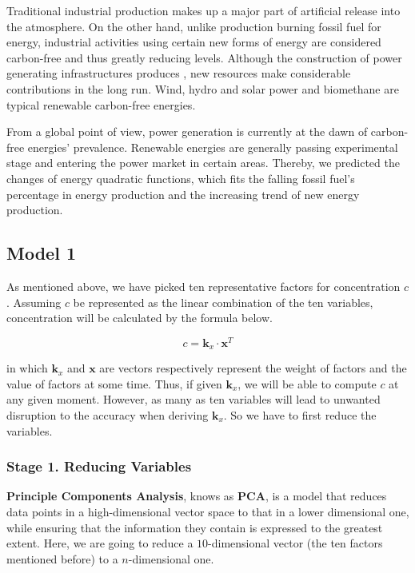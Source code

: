 \documentclass[12pt]{article}
\begin{document}
Traditional industrial production makes up a major part of  artificial release into the atmosphere. On the other hand, unlike production burning fossil fuel for energy, industrial activities using certain new forms of energy are considered carbon-free and thus greatly reducing  levels. Although the construction of power generating infrastructures produces , new resources make considerable contributions in the long run. Wind, hydro and solar power and biomethane are typical renewable carbon-free energies. 

From a global point of view, power generation is currently at the dawn of carbon-free energies' prevalence. Renewable energies are generally passing experimental stage and entering the power market in certain areas. Thereby, we predicted the changes of energy quadratic functions, which fits the falling fossil fuel's percentage in energy production and the increasing trend of new energy production. 


\subsection{Model 1}
As mentioned above, we have picked ten representative factors for  concentration $c$. Assuming $c$ be represented as the linear combination of the ten variables,  concentration will be calculated by the formula below.

\begin{equation}
    c = \boldsymbol{k}_x \cdot \boldsymbol{x}^T    
\end{equation}

in which $\boldsymbol{k}_x$ and $\boldsymbol{x}$ are vectors respectively represent the weight of factors and the value of factors at some time. Thus, if given $\boldsymbol{k}_x$, we will be able to compute $c$ at any given moment. However, as many as ten variables will lead to unwanted disruption to the accuracy when deriving $\boldsymbol{k}_x$. So we have to first reduce the variables.

\subsubsection{Stage 1. Reducing Variables}

\textbf{Principle Components Analysis}, knows as \textbf{PCA}, is a model that reduces data points in a high-dimensional vector space to that in a lower dimensional one, while ensuring that the information they contain is expressed to the greatest extent. Here, we are going to reduce a $10$-dimensional vector (the ten factors mentioned before) to a $n$-dimensional one. 
\end{document}
